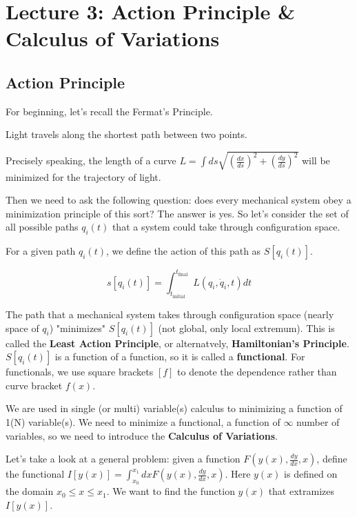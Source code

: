 \section{Lecture 3: Action Principle \& Calculus of Variations}

\subsection{Action Principle}

For beginning, let's recall the Fermat's Principle.

\begin{definition}
    Light travels along the shortest path between two points.
\end{definition}

Precisely speaking, the length of a curve $L = \int ds \sqrt{\left(\frac{dx}{ds}\right)^2 + \left(\frac{dy}{ds}\right)^2}$
will be minimized for the trajectory of light.

Then we need to ask the following question: does every mechanical system obey a 
minimization principle of this sort? The answer is yes. So let's consider the set of all
possible paths $q_i\left(t\right)$ that a system could take through configuration space.

For a given path $q_i\left(t\right)$, we define the action of this path as
$S[q_i\left(t\right)]$.

\[
    s[q_i\left(t\right)] = \int_{t_\text{initial}}^{t_\text{final}} L\left(q_i, \dot{q}_i, t\right) dt
\]

The path that a mechanical system takes through configuration space (nearly space of $q_i$)
"minimizes" $S[q_i\left(t\right)]$ (not global, only local extremum). This is called the
\textbf{Least Action Principle}, or alternatvely, \textbf{Hamiltonian's Principle}. 
$S[q_i\left(t\right)]$ is a function of a function, so it is called a \textbf{functional}.
For functionals, we use square brackets $[f]$ to denote the dependence rather than curve bracket
$f\left(x\right)$.

We are used in single (or multi) variable(s) calculus to minimizing a function of 1(N) 
variable(s). We need to minimize a functional, a function of $\infty$ number of variables,
so we need to introduce the \textbf{Calculus of Variations}. 

Let's take a look at a general problem: given a function $F\left(y\left(x\right), \frac{dy}{dx}, x\right)$, 
define the functional $I[y\left(x\right)]=\int_{x_{0}}^{x_{1}} dx F\left(y\left(x\right), \frac{dy}{dx}, x\right)$. 
Here $y\left(x\right)$ is defined on the domain $x_{0} \leq x \leq x_{1}$. We want to find the function
$y\left(x\right)$ that extramizes $I[y\left(x\right)]$.